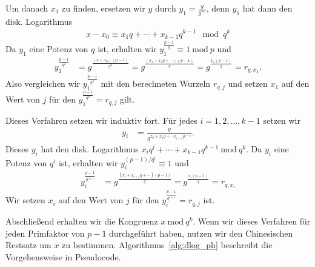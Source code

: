 \documentclass[
  a4paper,
  11pt,
]{scrartcl}
\theoremstyle{plain}
\theoremstyle{definition}
\theoremstyle{remark}
\newcommand{\Mod}[1]{\ \mathrm{mod}\ #1}
\begin{document}
Um danach $x_1$ zu finden, ersetzen wir $y$ durch $y_1 = \frac{y}{g^{x_0}}$,
denn $y_1$ hat dann den disk. Logarithmus
\begin{align*}
  x - x_0 \equiv x_1 q + \cdots + x_{k-1} q^{k-1} \mod q^k
\end{align*}
Da $y_1$ eine Potenz von $q$ ist, erhalten wir
$y_1^{\frac{p-1}{q}} \equiv 1 \Mod{p}$ und
\begin{align*}
  y_1^{\frac{p-1}{q^2}} &
    = g^{\frac{(x-x_0) (p-1)}{q^2}}
    = g^{\frac{(x_1 + x_2 q + \cdots) (p-1)}{q}}
    = g^{\frac{x_1 (p-1)}{q}}
    = r_{q, x_1}.
\end{align*}
Also vergleichen wir $y_1^{\frac{p-1}{q^2}}$ mit den berechneten Wurzeln
$r_{q, j}$ und setzen $x_1$ auf den Wert von $j$ für den
$y_1^{\frac{p-1}{q^2}} = r_{q, j}$ gilt.

Dieses Verfahren setzen wir induktiv fort. Für jedes $i = 1, 2, \ldots, k-1$
setzen wir
\begin{align*}
  y_i & = \frac{y}{g^{x_0 + x_1 q + \cdots x_{i-1} q^{i-1}}}.
\end{align*}
Dieses $y_i$ hat den disk. Logarithmus
$x_i q^i + \cdots + x_{k-1} q^{k-1} \Mod{q^k}$. Da $y_i$ eine Potenz von $q^i$
ist, erhalten wir $y_i^{(p-1)/q^i} \equiv 1$ und
\begin{align*}
  y_i^{\frac{p-1}{q^{i+1}}} &
    = g^{\frac{(x_i + x_{i+1} q + \cdots) (p-1)}{q}}
    = g^{\frac{x_i (p-1)}{q}}
    = r_{q, x_i}
\end{align*}
Wir setzen $x_i$ auf den Wert von $j$ für den 
$y_i^{\frac{p-1}{q^{i+1}}} = r_{q, j}$ ist. 
 
Abschließend erhalten wir die Kongruenz $x \Mod{q^k}$. Wenn wir dieses Verfahren 
für jeden Primfaktor von $p-1$ durchgeführt haben, nutzen wir den Chinesischen 
Restsatz um $x$ zu bestimmen. Algorithmus~\ref{alg:dlog_ph} beschreibt die 
Vorgehensweise in Pseudocode. 
\end{document}
